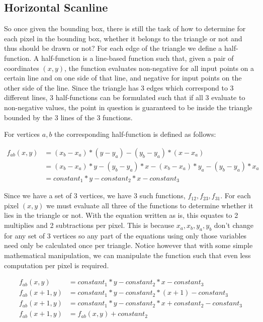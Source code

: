 \documentclass[letterpaper,10pt]{article}
\begin{document}
\subsection{Horizontal Scanline}
So once given the bounding box, there is still the task of how to determine for each pixel in the bounding box, whether it belongs to the triangle or not and thus should be drawn or not? For each edge of the triangle we define a half-function. A half-function is a line-based function such that, given a pair of coordinates $(x, y)$, the function evaluates non-negative for all input points on a certain line and on one side of that line, and negative for input points on the other side of the line. Since the triangle has 3 edges which correspond to 3 different lines, 3 half-functions can be formulated such that if all 3 evaluate to non-negative values, the point in question is guaranteed to be inside the triangle bounded by the 3 lines of the 3 functions.

For vertices $a, b$ the corresponding half-function is defined as follows:

\begin{align*}
    f_{ab}(x,y) &=  (x_{b}-x_{a})*(y-y_{a}) - (y_{b}-y_{a})*(x-x_{a})                           \\
    &=  (x_{b}-x_{a})*y-(y_{b}-y_{a})*x-(x_{b}-x_{a})*y_{a}-(y_{b}-y_{a})*x_{a}                           \\
    &= constant_{1}*y-constant_{2}*x- constant_{3}
\end{align*}

Since we have a set of 3 vertices,  we have 3 such functions, $f_{12}, f_{23}, f_{31}$. For each pixel $(x,y)$ we must evaluate all three of the functions to determine whether it lies in the triangle or not. With the equation written as is, this equates to 2 multiplies and 2 subtractions per pixel. This is because $x_a, x_b, y_a, y_b$ don't change for any set of 3 vertices so any part of the equations using only those variables need only be calculated once per triangle. Notice however that with some simple mathematical manipulation, we can manipulate the function such that even less computation per pixel is required.

\begin{align*}
    f_{ab}(x,y) &= constant_{1}*y-constant_{2}*x- constant_{3}					\\
    f_{ab}(x+1,y) &= constant_{1}*y-constant_{2}*(x+1)- constant_{3}		\\
    f_{ab}(x+1,y) &= constant_{1}*y-constant_{2}*x+constant_{2}- constant_{3} 	\\
    f_{ab}(x+1,y) &= f_{ab}(x,y) + constant_{2}	
\end{align*}
\end{document}
